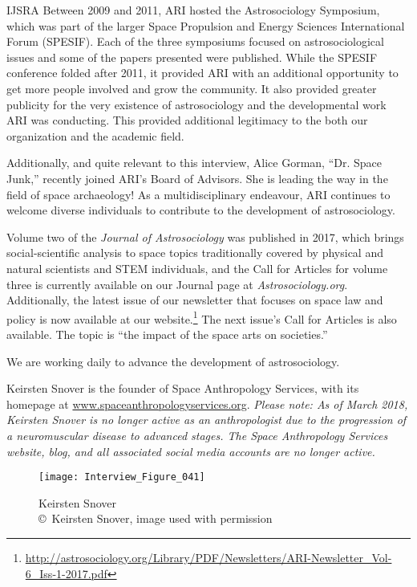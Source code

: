 \begin{labeling}{IJSRA}
	Between 2009 and 2011, ARI hosted the Astrosociology Symposium, which was part of the larger Space Propulsion and Energy Sciences International Forum (SPESIF). Each of the three symposiums focused on astrosociological issues and some of the papers presented were published. While the SPESIF conference folded after 2011, it provided ARI with an additional opportunity to get more people involved and grow the community. It also provided greater publicity for the very existence of astrosociology and the developmental work ARI was conducting. This provided additional legitimacy to the both our organization and the academic field.

	Additionally, and quite relevant to this interview, Alice Gorman, “Dr. Space Junk,” recently joined ARI’s Board of Advisors. She is leading the way in the field of space archaeology! As a multidisciplinary endeavour, ARI continues to welcome diverse individuals to contribute to the development of astrosociology.

	Volume two of the \emph{Journal of Astrosociology} was published in 2017, which brings social-scientific analysis to space topics traditionally covered by physical and natural scientists and STEM individuals, and the Call for Articles for volume three is currently available on our Journal page at \emph{Astrosociology.org}. Additionally, the latest issue of our newsletter that focuses on space law and policy is now available at our website.\footnote{\url{http://astrosociology.org/Library/PDF/Newsletters/ARI-Newsletter_Vol-6_Iss-1-2017.pdf}} The next issue’s Call for Articles is also available. The topic is “the impact of the space arts on societies.”

	We are working daily to advance the development of astrosociology.

\end{labeling}

\IJSRAseparator


Keirsten Snover is the founder of Space Anthropology Services, with its homepage at \href{www.spaceanthropologyservices.org}{www.spaceanthropologyservices.org}. \emph{Please note: As of March 2018, Keirsten Snover is no longer active as an anthropologist due to the progression of a neuromuscular disease to advanced stages. The Space Anthropology Services website, blog, and all associated social media accounts are no longer active.}

\begin{figure}[!tb]
	\texttt{[image: Interview\_Figure\_041]}
	\centering
	\caption{Keirsten Snover
		{\normalfont\scriptsize \\ \copyright\ Keirsten Snover, image used with permission
	}}
	\label{Interview_Figure_041}
\end{figure}

